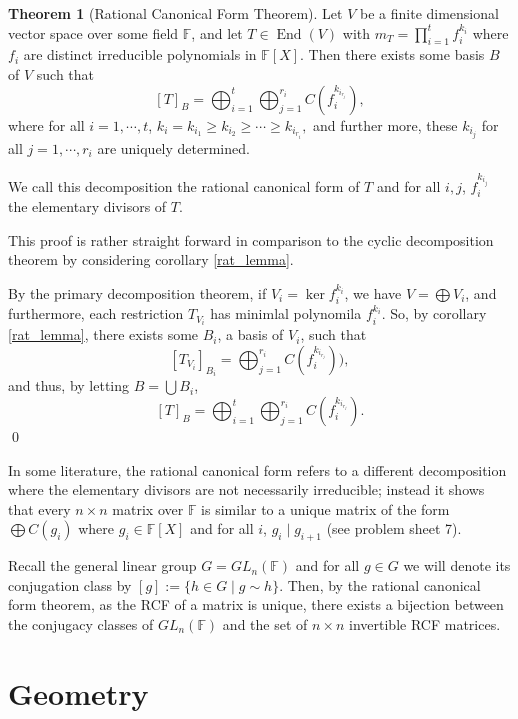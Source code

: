 \documentclass[
]{article}
\theoremstyle{definition}
\newtheorem{theorem}{Theorem}
\theoremstyle{definition}
\begin{document}
\begin{theorem}[Rational Canonical Form Theorem]
  Let \(V\) be a finite dimensional vector space over some field \(\mathbb{F}\), 
  and let \(T \in \mathop{\mathrm{End}}(V)\) with \(m_T = \prod_{i = 1}^t f_i^{k_i}\) where \(f_i\) 
  are distinct irreducible polynomials in \(\mathbb{F}[X]\). Then there exists 
  some basis \(B\) of \(V\) such that 
  \[[T]_B = \bigoplus_{i = 1}^t \bigoplus_{j = 1}^{r_i} C(f_i^{k_{i_{r_j}}}),\]
  where for all \(i = 1, \cdots, t\), \(k_i = k_{i_1} \ge k_{i_2} \ge \cdots 
  \ge k_{i_{r_i}},\) and further more, these \(k_{i_j}\) for all 
  \(j = 1, \cdots, r_i\) are uniquely determined. 
\end{theorem}

We call this decomposition the rational canonical form of \(T\) and for
all \(i, j\), \(f_i^{k_{i_j}}\) the elementary divisors of \(T\).

\proof

This proof is rather straight forward in comparison to the cyclic
decomposition theorem by considering corollary \ref{rat_lemma}.

By the primary decomposition theorem, if \(V_i = \ker f_i^{k_i}\), we
have \(V = \bigoplus V_i\), and furthermore, each restriction
\(T_{V_i}\) has minimlal polynomila \(f_i^{k_i}\). So, by corollary
\ref{rat_lemma}, there exists some \(B_i\), a basis of \(V_i\), such
that
\[[T_{V_i}]_{B_i} = \bigoplus_{j = 1}^{r_i} C(f_i^{k_{i_{r_j}}})),\] and
thus, by letting \(B = \bigcup B_i\),
\[[T]_B = \bigoplus_{i = 1}^t \bigoplus_{j = 1}^{r_i} C(f_i^{k_{i_{r_j}}}).\]
\qed

In some literature, the rational canonical form refers to a different
decomposition where the elementary divisors are not necessarily
irreducible; instead it shows that every \(n \times n\) matrix over
\(\mathbb{F}\) is similar to a unique matrix of the form
\(\bigoplus C(g_i)\) where \(g_i \in \mathbb{F}[X]\) and for all \(i\),
\(g_i \mid g_{i + 1}\) (see problem sheet 7).

Recall the general linear group \(G = GL_n(\mathbb{F})\) and for all
\(g \in G\) we will denote its conjugation class by
\([g] := \{h \in G \mid g \sim h\}\). Then, by the rational canonical
form theorem, as the RCF of a matrix is unique, there exists a bijection
between the conjugacy classes of \(GL_n(\mathbb{F})\) and the set of
\(n \times n\) invertible RCF matrices.

\newpage

\hypertarget{geometry}{%
\section{Geometry}\label{geometry}}
\end{document}
